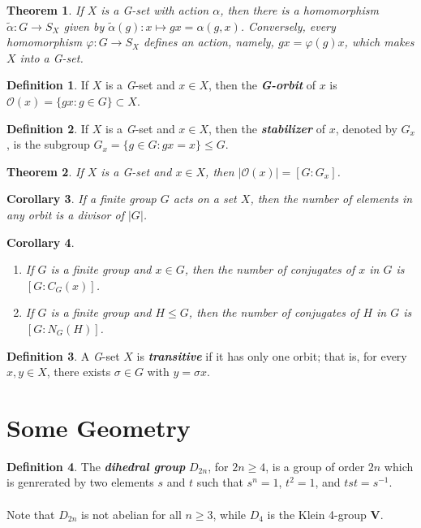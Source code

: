 \documentclass[12pt]{report}
\newtheorem{theorem}{Theorem}[chapter]
\newtheorem{corollary}[theorem]{Corollary}
\theoremstyle{definition}
\newtheorem*{definition}{Definition}
\newcommand{\term}[1]{\textbf{\textit{#1}}}
\begin{document}
\begin{theorem}
	If $X$ is a G-set with action $\alpha$, then there is a homomorphism $\tilde{\alpha}:G\to S_X$ given by $\tilde{\alpha}(g):x\mapsto gx=\alpha(g,x)$. Conversely, every homomorphism $\varphi:G\to S_X$ defines an action, namely, $gx=\varphi(g)x$, which makes $X$ into a G-set.
\end{theorem}

\begin{definition}
	If $X$ is a \textit{G}-set and $x\in X$, then the \term{G-orbit} of $x$ is $\mathcal{O}(x)=\{gx:g\in G\}\subset X$.
\end{definition}

\begin{definition}
	If $X$ is a \textit{G}-set and $x\in X$, then the \term{stabilizer} of $x$, denoted by $G_x$, is the subgroup $G_x=\{g\in G:gx=x\}\leq G$.
\end{definition}

\begin{theorem}
	If $X$ is a \textit{G}-set and $x\in X$, then $|\mathcal{O}(x)|=[G:G_x]$.
\end{theorem}

\begin{corollary}
	If a finite group $G$ acts on a set $X$, then the number of elements in any orbit is a divisor of $|G|$.
\end{corollary}

\begin{corollary}
	\quad
	\begin{enumerate}
		\item If $G$ is a finite group and $x\in G$, then the number of conjugates of $x$ in $G$ is $[G:C_G(x)]$.
		\item If $G$ is a finite group and $H\leq G$, then the number of conjugates of $H$ in $G$ is $[G:N_G(H)]$.
	\end{enumerate}
\end{corollary}

\begin{definition}
	A \textit{G}-set $X$ is \term{transitive} if it has only one orbit; that is, for every $x,y\in X$, there exists $\sigma\in G$ with $y=\sigma x$.
\end{definition}

\section{Some Geometry}
\begin{definition}
	The \term{dihedral group} $D_{2n}$, for $2n\geq 4$, is a group of order $2n$ which is genrerated by two elements $s$ and $t$ such that $s^n=1$, $t^2=1$, and $tst=s^{-1}$.\\
	\\
	Note that $D_{2n}$ is not abelian for all $n\geq 3$, while $D_4$ is the Klein 4-group $\mathbf{V}$.
\end{definition}
\end{document}
